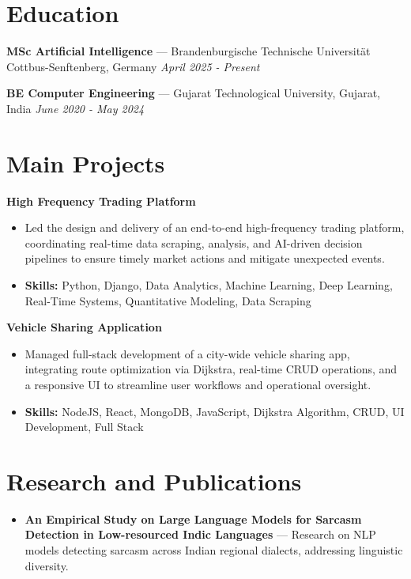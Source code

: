 \documentclass[a4paper,10pt]{article}
\begin{document}
\section*{Education}
\textbf{MSc Artificial Intelligence} — Brandenburgische Technische Universität Cottbus-Senftenberg, Germany \hfill \textit{April 2025 - Present}\par
\vspace{1.5pt}
\textbf{BE Computer Engineering} — Gujarat Technological University, Gujarat, India \hfill \textit{June 2020 - May 2024}\par

\section*{Main Projects}
\textbf{High Frequency Trading Platform}\par
\vspace{1pt}
\begin{itemize}
  \item Led the design and delivery of an end-to-end high-frequency trading platform, coordinating real-time data scraping, analysis, and AI-driven decision pipelines to ensure timely market actions and mitigate unexpected events.
  \item \textbf{Skills:} Python, Django, Data Analytics, Machine Learning, Deep Learning, Real-Time Systems, Quantitative Modeling, Data Scraping
\end{itemize}
\vspace{3pt}
\textbf{Vehicle Sharing Application}\par
\vspace{1pt}
\begin{itemize}
  \item Managed full-stack development of a city-wide vehicle sharing app, integrating route optimization via Dijkstra, real-time CRUD operations, and a responsive UI to streamline user workflows and operational oversight.
  \item \textbf{Skills:} NodeJS, React, MongoDB, JavaScript, Dijkstra Algorithm, CRUD, UI Development, Full Stack
\end{itemize}

\section*{Research and Publications}
\begin{itemize}
\item \textbf{An Empirical Study on Large Language Models for Sarcasm Detection in Low-resourced Indic Languages} — Research on NLP models detecting sarcasm across Indian regional dialects, addressing linguistic diversity.
\end{itemize}
\end{document}
